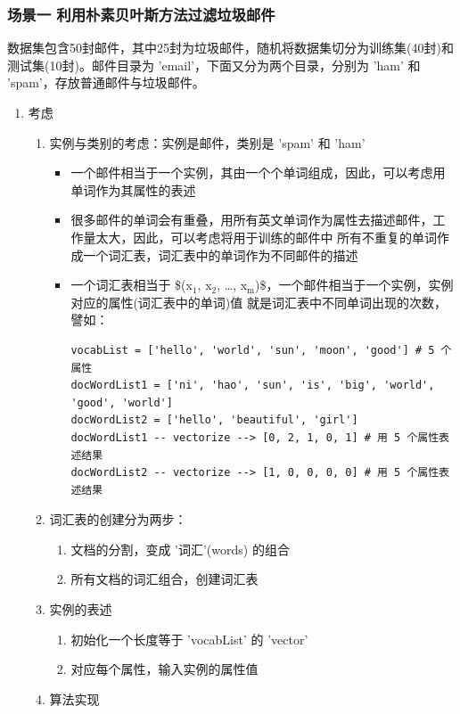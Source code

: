 \documentclass[11pt]{ctexart}
\begin{document}
\subsubsection{场景一 利用朴素贝叶斯方法过滤垃圾邮件}
\label{sec:orgheadline41}
数据集包含50封邮件，其中25封为垃圾邮件，随机将数据集切分为训练集(40封)和测试集(10封)。邮件目录为
'email'，下面又分为两个目录，分别为 'ham' 和 'spam'，存放普通邮件与垃圾邮件。
\begin{enumerate}
\item 考虑
\label{sec:orgheadline39}
\begin{enumerate}
\item 实例与类别的考虑：实例是邮件，类别是 'spam' 和 'ham'
\begin{itemize}
\item 一个邮件相当于一个实例，其由一个个单词组成，因此，可以考虑用单词作为其属性的表述
\item 很多邮件的单词会有重叠，用所有英文单词作为属性去描述邮件，工作量太大，因此，可以考虑将用于训练的邮件中
所有不重复的单词作成一个词汇表，词汇表中的单词作为不同邮件的描述
\item 一个词汇表相当于 \$(x\(_{\text{1}}\), x\(_{\text{2}}\), \ldots, x\(_{\text{m}}\))\$，一个邮件相当于一个实例，实例对应的属性(词汇表中的单词)值
就是词汇表中不同单词出现的次数，譬如：
\begin{verbatim}
vocabList = ['hello', 'world', 'sun', 'moon', 'good'] # 5 个属性
docWordList1 = ['ni', 'hao', 'sun', 'is', 'big', 'world', 'good', 'world']
docWordList2 = ['hello', 'beautiful', 'girl']
docWordList1 -- vectorize --> [0, 2, 1, 0, 1] # 用 5 个属性表述结果
docWordList2 -- vectorize --> [1, 0, 0, 0, 0] # 用 5 个属性表述结果
\end{verbatim}
\end{itemize}
\item 词汇表的创建分为两步：
\begin{enumerate}
\item 文档的分割，变成 '词汇'(words) 的组合
\item 所有文档的词汇组合，创建词汇表
\end{enumerate}
\item 实例的表述
\begin{enumerate}
\item 初始化一个长度等于 'vocabList' 的 'vector'
\item 对应每个属性，输入实例的属性值
\end{enumerate}
\item 算法实现
\begin{enumerate}

\end{enumerate}
\end{enumerate}
\end{enumerate}
\end{document}
